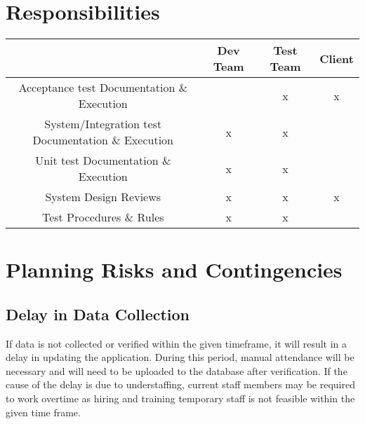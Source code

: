 \documentclass{scrreprt}
\begin{document}
\chapter{Responsibilities}
\begin{center}
\begin{tabular}{|c c c c|} 
 \hline
   & Dev Team & Test Team & Client \\ [0.5ex] 
 \hline
 Acceptance test Documentation \& Execution  &  & x & x \\ 
 \hline
 System/Integration test Documentation \& Execution & x & x &  \\
 \hline
 Unit test Documentation \& Execution & x & x &  \\
 \hline
 System Design Reviews & x & x & x \\
 \hline
 Test Procedures \& Rules & x & x &  \\ [1ex] 
 \hline
\end{tabular}
\end{center}

\chapter{Planning Risks and Contingencies}
\section{Delay in Data Collection}
If data is not collected or verified within the given timeframe, it will result in a delay in updating the application. During this period, manual attendance will be necessary and will need to be uploaded to the database after verification.
If the cause of the delay is due to understaffing, current staff members may be required to work overtime as hiring and training temporary staff is not feasible within the given time frame.
\end{document}

